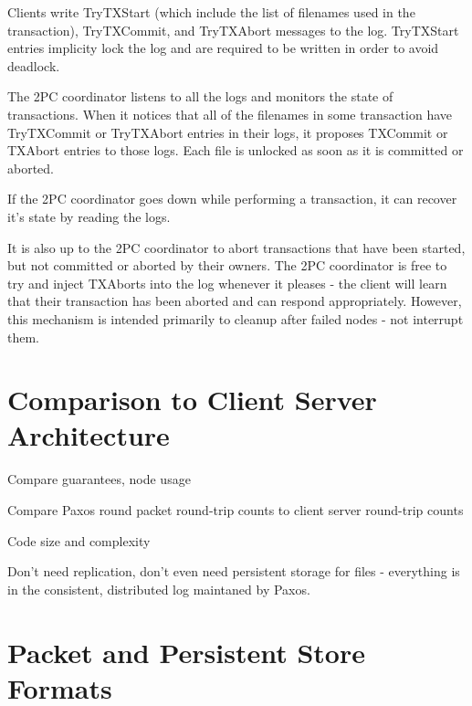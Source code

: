 \documentclass[11pt]{article}
\begin{document}
Clients write TryTXStart (which include the list of filenames used in the transaction), TryTXCommit, and TryTXAbort messages to the log.
TryTXStart entries implicity lock the log and are required to be written in order to avoid deadlock.

The 2PC coordinator listens to all the logs and monitors the state of transactions.
When it notices that all of the filenames in some transaction have TryTXCommit or TryTXAbort entries in their logs,
it proposes TXCommit or TXAbort entries to those logs. Each file is unlocked as soon as it is committed or aborted.

If the 2PC coordinator goes down while performing a transaction, it can recover it's state by reading the logs.

It is also up to the 2PC coordinator to abort transactions that have been started, but not committed or aborted by their owners.
The 2PC coordinator is free to try and inject TXAborts into the log whenever it pleases -
the client will learn that their transaction has been aborted and can respond appropriately.
However, this mechanism is intended primarily to cleanup after failed nodes - not interrupt them.

\section{Comparison to Client Server Architecture}

Compare guarantees, node usage

Compare Paxos round packet round-trip counts to client server round-trip counts

Code size and complexity

Don't need replication, don't even need persistent storage for files - everything is in the consistent, distributed log maintaned by Paxos.

\section{Packet and Persistent Store Formats}
\end{document}
